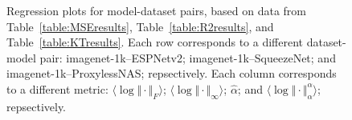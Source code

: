 \begin{figure}[t]
{        \label{fig:summary_regressions_D_10}
    }
    \caption{Regression plots for model-dataset pairs, based on data from Table~\ref{table:MSEresults}, Table~\ref{table:R2results}, and Table~\ref{table:KTresults}.
             Each row corresponds to a different dataset-model pair:
             imagenet-1k--ESPNetv2;
             imagenet-1k--SqueezeNet;
             and
             imagenet-1k--ProxylessNAS;
             repsectively.
             Each column corresponds to a different metric:
             $\langle\log\Vert\cdot\Vert_{F}\rangle$; 
             $\langle\log\Vert\cdot\Vert_{\infty}\rangle$; 
             $\hat{\alpha}$; 
             and
             $\langle\log\Vert\cdot\Vert^{\alpha}_{\alpha}\rangle$;
             repsectively.
            }
    \label{fig:summary_regressions_D}
\end{figure}

